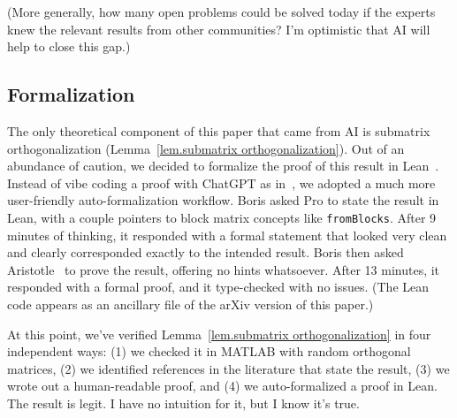 \documentclass[11pt]{article}
\theoremstyle{plain}
\theoremstyle{definition}
\begin{document}
(More generally, how many open problems could be solved today if the experts knew the relevant results from other communities?
I'm optimistic that AI will help to close this gap.)

\subsection{Formalization}

The only theoretical component of this paper that came from AI is submatrix orthogonalization (Lemma~\ref{lem.submatrix orthogonalization}).
Out of an abundance of caution, we decided to formalize the proof of this result in Lean~\cite{MouraU:21}.
Instead of vibe coding a proof with ChatGPT as in~\cite{AlexeevM:25}, we adopted a much more user-friendly auto-formalization workflow.
Boris asked Pro to state the result in Lean, with a couple pointers to block matrix concepts like \texttt{fromBlocks}. 
After 9 minutes of thinking, it responded with a formal statement that looked very clean and clearly corresponded exactly to the intended result.
Boris then asked Aristotle~\cite{AchimEtal:25} to prove the result, offering no hints whatsoever. 
After 13 minutes, it responded with a formal proof, and it type-checked with no issues.
(The Lean code appears as an ancillary file of the arXiv version of this paper.)

At this point, we've verified Lemma~\ref{lem.submatrix orthogonalization} in four independent ways: (1) we checked it in MATLAB with random orthogonal matrices, (2) we identified references in the literature that state the result, (3) we wrote out a human-readable proof, and (4) we auto-formalized a proof in Lean.
The result is legit. 
I have no intuition for it, but I know it's true.
\end{document}
